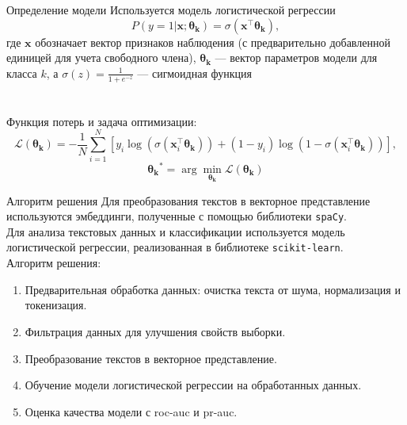 \documentclass{beamer}
\begin{document}
\begin{frame}{Определение модели}
Используется модель логистической регрессии
$$P(y=1 | \mathbf{x}; \boldsymbol{\theta_k}) = \sigma(\mathbf{x}^\top \boldsymbol{\theta_k}),$$
где $\mathbf{x}$ обозначает вектор признаков наблюдения (с предварительно добавленной единицей для учета свободного члена), $\boldsymbol{\theta_k}$ --- вектор параметров модели для класса $k$, а $\sigma(z) = \frac{1}{1 + e^{-z}}$ --- сигмоидная функция \\ 

\\ \bigskip \\
Функция потерь и задача оптимизации:
$$\mathcal{L}(\boldsymbol{\theta_k}) = -\frac{1}{N} \sum_{i=1}^{N} \left[ y_i \log(\sigma(\mathbf{x}_i^\top \boldsymbol{\theta_k})) + (1 - y_i) \log(1 - \sigma(\mathbf{x}_i^\top \boldsymbol{\theta_k})) \right],$$
$$\boldsymbol{\theta_k}^* = \arg\min_{\boldsymbol{\theta_k}} \mathcal{L}(\boldsymbol{\theta_k})$$
\end{frame}
\begin{frame}{Алгоритм решения}
Для преобразования текстов в векторное представление используются эмбеддинги, полученные с помощью библиотеки \texttt{spaCy}.\\
Для анализа текстовых данных и классификации используется модель логистической регрессии, реализованная в библиотеке \texttt{scikit-learn}.\\

Алгоритм решения:
\begin{enumerate}
    \item Предварительная обработка данных: очистка текста от шума, нормализация и токенизация.
    \item Фильтрация данных для улучшения свойств выборки.
    \item Преобразование текстов в векторное представление.
    \item Обучение модели логистической регрессии на обработанных данных.
    \item Оценка качества модели с roc-auc и pr-auc.
\end{enumerate}
\end{frame}
\end{document}
